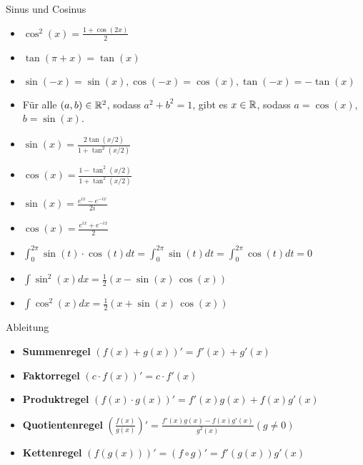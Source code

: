 \begin{Rechenregeln}{Sinus und Cosinus}{}
\begin{itemize}
    \item $\cos^2(x) = \frac{1+\cos(2x)}{2}$
    \item $\tan(\pi + x) = \tan(x)$
    \item $\sin(-x) = \sin(x), \cos(-x) = \cos(x), \tan(-x) = -\tan(x)$
    \item Für alle $(a,b)\in \mathbb{R}^2$, sodass $a^2+b^2 = 1$, gibt es $x\in\mathbb{R}$, sodass $a = \cos(x)$, $b = \sin(x)$.
    \item $\sin(x) = \frac{2\tan(x/2)}{1+\tan^2(x/2)}$
    \item $\cos(x) = \frac{1-\tan^2(x/2)}{1+\tan^2(x/2)}$
    \item $\sin(x) = \frac{e^{ix} - e^{-ix}}{2i}$
    \item $\cos(x) = \frac{e^{ix} + e^{-ix}}{2}$
    \item $\int_0^{2\pi} \sin(t)\cdot \cos(t) dt = \int_0^{2\pi} \sin(t) dt = \int_0^{2\pi} \cos(t) dt = 0$\\
    \item $\int \sin^2(x) dx = \frac{1}{2} (x-\sin(x) \, \cos(x))$\\
    \item $\int \cos^2(x) dx = \frac{1}{2} (x+\sin(x) \, \cos(x))$
    \end{itemize}
\end{Rechenregeln}

\begin{Rechenregeln}{Ableitung}{}
    \begin{itemize}
        \item \textbf{Summenregel} $(f(x)+g(x))' = f'(x) + g'(x)$
        \item \textbf{Faktorregel} $(c\cdot f(x))' = c\cdot f'(x)$
        \item \textbf{Produktregel} $(f(x)\cdot g(x))' = f'(x)g(x) + f(x)g'(x)$
        \item \textbf{Quotientenregel} $\left(\frac{f(x)}{g(x)}\right)' = \frac{f'(x)g(x) - f(x)g'(x)}{g^2(x)}(g\neq 0)$
        \item \textbf{Kettenregel} $(f(g(x)))' = (f\circ g)' = f'(g(x))g'(x)$
    \end{itemize}
\end{Rechenregeln}

